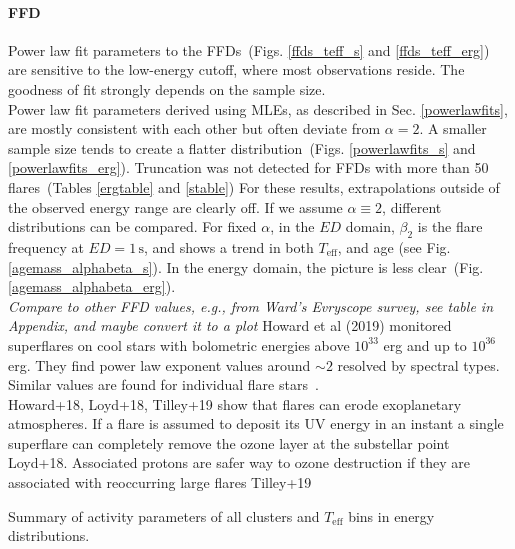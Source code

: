 \documentclass{aa}
\begin{document}
\paragraph{FFD}
Power law fit parameters to the FFDs~(Figs. \ref{ffds_teff_s} and \ref{ffds_teff_erg}) are sensitive to the low-energy cutoff, where most observations reside. The goodness of fit strongly depends on the sample size.
\\
Power law fit parameters derived using MLEs, as described in Sec. \ref{powerlawfits}, are mostly consistent with each other but often deviate from $\alpha=2$. A smaller sample size tends to create a flatter distribution~(Figs. \ref{powerlawfits_s} and \ref{powerlawfits_erg}). Truncation was not detected for FFDs with more than 50 flares~(Tables \ref{ergtable} and \ref{stable}) For these results, extrapolations outside of the observed energy range are clearly off. If we assume $\alpha \equiv 2$,  different distributions can be compared. For fixed $\alpha$, in the $ED$ domain, $\beta_2$ is the flare frequency at $ED=1\,\mathrm{s}$, and shows a trend in both $T_\mathrm{eff}$, and age (see Fig. \ref{agemass_alphabeta_s}). In the energy domain, the picture is less clear~(Fig. \ref{agemass_alphabeta_erg}).
\\
\textit{Compare to other FFD values, e.g., from Ward's Evryscope survey, see table in Appendix, and maybe convert it to a plot}
Howard et al (2019) monitored superflares on cool stars with bolometric energies above $10^{33}$ erg and up to $10^{36}$erg. They find power law exponent values around $\sim 2$ resolved by spectral types. Similar values are found for individual flare stars~\citep{lurie_kepler_2015}.
\\
Howard+18, Loyd+18, Tilley+19 show that flares can erode exoplanetary atmospheres. If a flare is assumed to deposit its UV energy in an instant a single superflare can completely remove the ozone layer at the substellar point Loyd+18. Associated protons are safer way to ozone destruction if they are associated with reoccurring large flares Tilley+19
\begin{table}
\caption{Summary of activity parameters of all clusters and $T_\mathrm{eff}$ bins in energy distributions.}\label{ergtable}
\centering
\tiny

\end{table}
\end{document}
